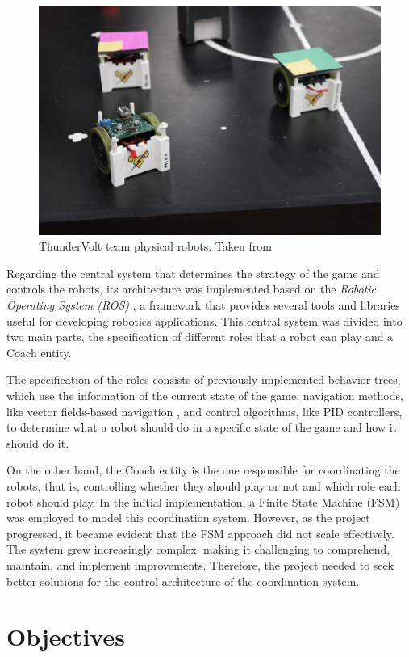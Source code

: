 \begin{figure}[!ht]
    \centering
    \includegraphics[width=.6\linewidth]{chapters/introduction/images/ThunderVolt Robots.jpeg}
    \caption{ThunderVolt team physical robots. Taken from \cite{ThunderVolt}}
    \label{fig:physical_robots}
\end{figure}

Regarding the central system that determines the strategy of the game and controls the robots, its architecture was implemented based on the \textit{Robotic Operating System (ROS)} \cite{ROS}, a framework that provides several tools and libraries useful for developing robotics applications. This central system was divided into two main parts, the specification of different roles that a robot can play and a Coach entity.

The specification of the roles consists of previously implemented behavior trees, which use the information of the current state of the game, navigation methods, like vector fields-based navigation \cite{VectorFields}, and control algorithms, like PID controllers, to determine what a robot should do in a specific state of the game and how it should do it.

On the other hand, the Coach entity is the one responsible for coordinating the robots, that is, controlling whether they should play or not and which role each robot should play. In the initial implementation, a Finite State Machine (FSM) was employed to model this coordination system. However, as the project progressed, it became evident that the FSM approach did not scale effectively. The system grew increasingly complex, making it challenging to comprehend, maintain, and implement improvements. Therefore, the project needed to seek better solutions for the control architecture of the coordination system.

\section{Objectives}

